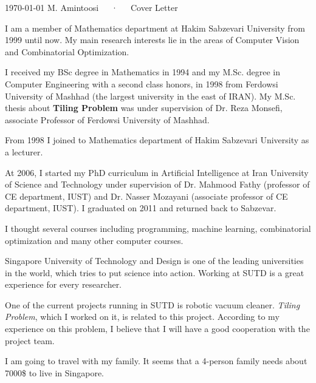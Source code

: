 \documentclass[11pt, a4paper]{awesome-cv}
\begin{document}
\makecvheader[R]

\makecvfooter
  {\today}
  {M. Amintoosi~~~·~~~Cover Letter}
  {}

\makelettertitle

\begin{cvletter}

I am a member of Mathematics department at Hakim Sabzevari University from 1999 until now. My main research interests lie in the areas of Computer Vision and Combinatorial Optimization.

I received my BSc degree in Mathematics  in 1994 and my M.Sc. degree in Computer Engineering  with a second class honors, in 1998 from Ferdowsi University of Mashhad (the largest university in the east of IRAN). My M.Sc. thesis about \textbf{Tiling Problem} was under supervision of Dr. Reza Monsefi, associate Professor of Ferdowsi University of Mashhad. 

From 1998 I joined to Mathematics department of Hakim Sabzevari University as a lecturer. 

At 2006, I started my PhD curriculum in Artificial Intelligence at Iran University of Science and Technology under supervision of Dr. Mahmood Fathy (professor of CE department, IUST) and Dr. Nasser Mozayani (associate professor of CE department, IUST). I graduated on 2011 and returned back to Sabzevar.

I thought several courses including programming, machine learning, combinatorial optimization and many other computer courses.

Singapore University of Technology and Design is one of the leading universities in the world, which tries to put science into action. Working at SUTD is a great experience for every researcher.

One of the current projects running in SUTD is robotic vacuum cleaner. \emph{Tiling Problem}, which I worked on it, is  related to this project. According to my experience on this problem, I believe that I will have a good cooperation with the project team. 





I am going to travel with my family. It seems that a 4-person family needs about 7000\$ to live in Singapore.

\end{cvletter}


\makeletterclosing
\end{document}
